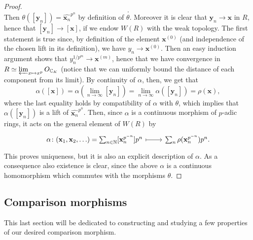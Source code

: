 \begin{proof}
\begin{equation*}
	.\end{equation*}
	Then $\theta([\mathbf{y}_n]) = \widehat{\mathbf{x}_n}^{p^n}$ by definition of $\theta$.
	Moreover it is clear that $\mathbf{y}_n \to \mathbf{x}$ in $R$,
	hence that $[\mathbf{y}_n] \to [\mathbf{x}]$, if we endow $W(R)$ with the weak topology.
	The first statement is true since, by definition of the element $\mathbf{x}^{(0)}$
	(and independence of the chosen lift in its definition), we have
	$y_n \to \mathbf{x}^{(0)}$. Then an easy induction argument
	shows that $y_n^{1/p^m} \to \mathbf{x}^{(m)}$, hence that we have convergence
	in $R \simeq \varprojlim_{x \mapsto x^p}O_{\mathbb{C}_K}$ (notice that we
	can uniformly bound the distance of each component from its limit).
	By continuity of $\alpha$, then, we get that
	\begin{equation*}
		\alpha([\mathbf{x}]) = \alpha\left(\lim_{n \to \infty} [\mathbf{y}_n]\right) =
		\lim_{n \to \infty} \alpha([\mathbf{y}_n]) = \rho(\mathbf{x})
	,\end{equation*}
	where the last equality holds by compatibility of $\alpha$ with $\theta$,
	which implies that $\alpha([\mathbf{y}_n])$ is a lift of $\widehat{\mathbf{x}_n}^{p^n}$.
	Then, since $\alpha$ is a continuous morphism of $p$-adic rings,
	it acts on the general element of $W(R)$ by
	\begin{equation*}
	\begin{tikzcd}[row sep = 0ex
		,/tikz/column 1/.append style={anchor=base east}
		,/tikz/column 2/.append style={anchor=base west}]
		\alpha\colon 
		(\mathbf{x}_1, \mathbf{x}_2, \ldots) =
		\sum_{n \in \mathbb{N} }^{  } [\mathbf{x}_n^{p^{-n}}] p^n
		\arrow[r, "", mapsto] &
		\sum_{n }^{  } \rho (\mathbf{x}_n^{p^{-n}}) p^n
	.\end{tikzcd}
	\end{equation*} 
	This proves uniqueness, but it is also an explicit description of $\alpha$.
	As a consequence also existence is clear, since the above $\alpha$ is
	a continuous homomorphism which commutes with the morphisms $\theta$.
\end{proof}



\subsection{Comparison morphisms}
This last section will be dedicated to constructing and studying a few properties
of our desired comparison morphism.


